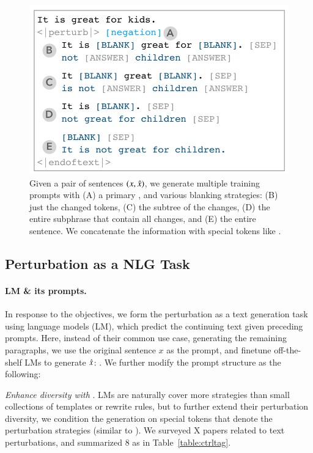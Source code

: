 \begin{figure}[t]
\centering
\includegraphics[width=1\columnwidth]{figures/blank}
\vspace{-15pt}
\caption{Given a pair of sentences $(x, \hat{x})$, we generate multiple training prompts with (A) a primary \tagstr, and various blanking strategies: (B) just the changed tokens, (C) the subtree of the changes, (D) the entire subphrase that contain all changes, and (E) the entire sentence.
We concatenate the information with special tokens like \perturbtoken.
}
\vspace{-10pt}
\label{fig:blank}
\end{figure}

\subsection{Perturbation as a NLG Task}

\paragraph{LM \& its prompts.}
In response to the objectives, we form the perturbation as a text generation task using language models (LM), which predict the continuing text given preceding prompts.
Here, instead of their common use case, \ie generating the remaining paragraphs, we use the original sentence $x$ as the prompt, and finetune off-the-shelf LMs to generate $\hat{x}$: .
We further modify the prompt structure as the following:

\emph{Enhance diversity with \tagstrs}.
LMs are naturally cover more strategies than small collections of templates or rewrite rules, but to further extend their perturbation diversity, we condition the generation on special tokens that denote the perturbation strategies (similar to \citet{raffel2019exploring, Dathathri2020Plug}).
We surveyed X papers related to text perturbations, and summarized 8 \tagstrs as in Table~\ref{table:ctrltag}.

